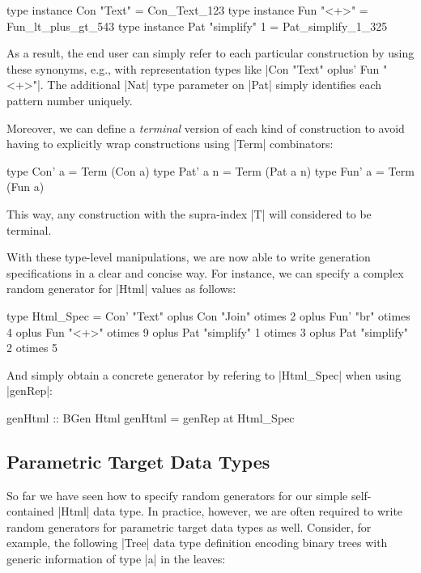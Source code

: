 \begin{code}
type instance Con "Text"        = Con_Text_123
type instance Fun "<+>"         = Fun_lt_plus_gt_543
type instance Pat "simplify" 1  = Pat_simplify_1_325
\end{code}
%
As a result, the end user can simply refer to each particular construction by
using these synonyms, e.g., with representation types like |Con "Text" oplus'
Fun "<+>"|.
%
The additional |Nat| type parameter on |Pat| simply identifies each pattern
number uniquely.


Moreover, we can define a \emph{terminal} version of each kind of construction
to avoid having to explicitly wrap constructions using |Term| combinators:

\begin{code}
type Con' a    = Term  (Con a)
type Pat' a n  = Term  (Pat a n)
type Fun' a    = Term  (Fun a)
\end{code}
%
This way, any construction with the supra-index |T| will considered to be
terminal.


With these type-level manipulations, we are now able to write generation
specifications in a clear and concise way.
%
For instance, we can specify a complex random generator for |Html| values as
follows:

\begin{code}
type Html_Spec
  =      Con'  "Text"
  oplus  Con   "Join"         otimes 2
  oplus  Fun'  "br"           otimes 4
  oplus  Fun   "<+>"          otimes 9
  oplus  Pat   "simplify"  1  otimes 3
  oplus  Pat   "simplify"  2  otimes 5
\end{code}

And simply obtain a concrete generator by refering to |Html_Spec| when using
|genRep|:

\begin{code}
genHtml :: BGen Html
genHtml = genRep at Html_Spec
\end{code}


%
\subsection{Parametric Target Data Types }

So far we have seen how to specify random generators for our simple
self-contained |Html| data type.
%
In practice, however, we are often required to write random generators for
parametric target data types as well.
%
Consider, for example, the following |Tree| data type definition encoding binary
trees with generic information of type |a| in the leaves:

